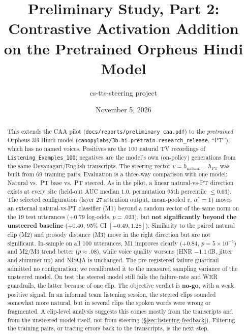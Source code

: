 \documentclass[11pt]{article}
\title{Preliminary Study, Part 2: Contrastive Activation Addition\\on the Pretrained Orpheus Hindi Model}
\author{cs-tts-steering project}
\date{November 5, 2026}
\newcommand{\astar}{\alpha^{*}}
\begin{document}
\maketitle

\begin{abstract}
This extends the CAA pilot (\texttt{docs/reports/preliminary\_caa.pdf}) to the \emph{pretrained} Orpheus 3B Hindi model (\texttt{canopylabs/3b-hi-pretrain-research\_release}, ``PT''), which has no named voices. Positives are the 100 natural TV recordings of \texttt{Listening\_Examples\_100}; negatives are the model's own (on-policy) generations from the same Devanagari/English transcripts. The steering vector $v=\bar h_{\text{natural}}-\bar h_{\text{PT}}$ was built from 69 training pairs. Evaluation is a three-way comparison with one model: Natural vs.\ PT base vs.\ PT steered. As in the pilot, a linear natural-vs-PT direction exists at every site (held-out AUC median $1.0$, permutation 95th percentile $\le0.63$). The selected configuration (layer 27 attention output, mean-pooled $v$, $\astar=1$) moves an external natural-vs-PT classifier (M1) beyond a random vector of the same norm on the 19 test utterances ($+0.79$ log-odds, $p=.023$), but \textbf{not significantly beyond the unsteered baseline} ($+0.40$, 95\% CI $[-0.49,1.28]$). Similarity to the paired natural clip (M2) and prosody distance (M3) move in the right direction but are not significant. In-sample on all 100 utterances, M1 improves clearly ($+0.84$, $p=5\times10^{-5}$) and M2/M3 trend better ($p\approx.08$), while voice quality worsens (HNR $-1.1$\,dB, jitter and shimmer up) and NISQA is unchanged. The pre-registered failure guardrail admitted no configuration; we recalibrated it to the measured sampling variance of the unsteered model. On test the steered model still fails the failure-rate and WER guardrails, the latter because of one clip. The objective verdict is \textbf{no-go}, with a weak positive signal. In an informal team listening session, the steered clips sounded somewhat more natural, but in several clips the spoken words were wrong or fragmented. A clip-level analysis suggests this comes mostly from the transcripts and from the unsteered model itself, not from steering (\S\ref{sec:listening-feedback}). Filtering the training pairs, or tracing errors back to the transcripts, is the next step.
\end{abstract}
\end{document}
